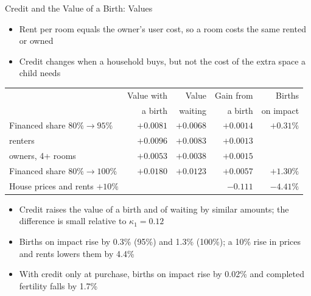 \begin{frame}[t]{Credit and the Value of a Birth: Values}
\footnotesize
\begin{itemize}\setlength\itemsep{1pt}
\item Rent per room equals the owner's user cost, so a room costs the same rented or owned
\item Credit changes when a household buys, but not the cost of the extra space a child needs
\end{itemize}
\smallskip

\scriptsize\setlength{\tabcolsep}{5pt}\renewcommand{\arraystretch}{0.92}
\begin{tabularx}{\textwidth}{@{}Xrrrr@{}}
\toprule
 & Value with & Value & Gain from & Births \\
 & a birth & waiting & a birth & on impact \\
\midrule
Financed share $80\%\to95\%$ & $+0.0081$ & $+0.0068$ & $+0.0014$ & $+0.31\%$ \\
\quad renters & $+0.0096$ & $+0.0083$ & $+0.0013$ & \\
\quad owners, 4+ rooms & $+0.0053$ & $+0.0038$ & $+0.0015$ & \\
Financed share $80\%\to100\%$ & $+0.0180$ & $+0.0123$ & $+0.0057$ & $+1.30\%$ \\
\addlinespace[2pt]
House prices and rents $+10\%$ & & & $-0.111$ & $-4.41\%$ \\
\bottomrule
\end{tabularx}
\smallskip

\footnotesize
\begin{itemize}\setlength\itemsep{1pt}
\item Credit raises the value of a birth and of waiting by similar amounts; the difference is small relative to $\kappa_1=0.12$
\item Births on impact rise by 0.3\% (95\%) and 1.3\% (100\%); a 10\% rise in prices and rents lowers them by 4.4\%
\item With credit only at purchase, births on impact rise by 0.02\% and completed fertility falls by 1.7\%
\end{itemize}
\end{frame}
